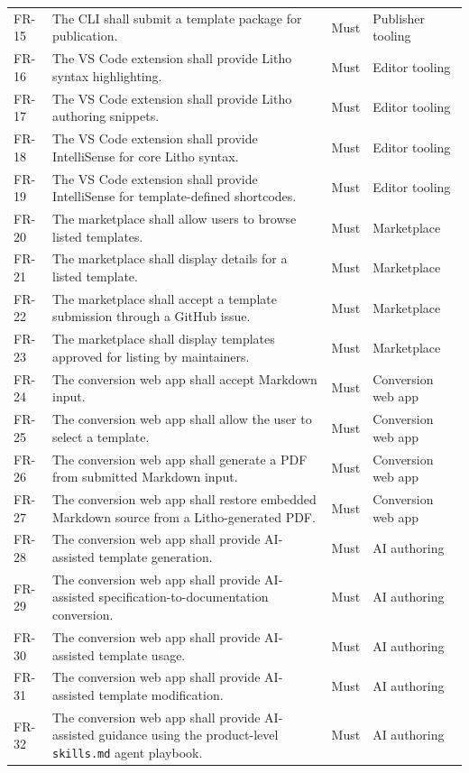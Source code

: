 \begin{xltabular}{\textwidth}{@{}p{0.12\textwidth}X p{0.15\textwidth}p{0.20\textwidth}@{}}
FR-15 & The CLI shall submit a template package for publication. & Must & Publisher tooling \\
FR-16 & The VS Code extension shall provide Litho syntax highlighting. & Must & Editor tooling \\
FR-17 & The VS Code extension shall provide Litho authoring snippets. & Must & Editor tooling \\
FR-18 & The VS Code extension shall provide IntelliSense for core Litho syntax. & Must & Editor tooling \\
FR-19 & The VS Code extension shall provide IntelliSense for template-defined shortcodes. & Must & Editor tooling \\
FR-20 & The marketplace shall allow users to browse listed templates. & Must & Marketplace \\
FR-21 & The marketplace shall display details for a listed template. & Must & Marketplace \\
FR-22 & The marketplace shall accept a template submission through a GitHub issue. & Must & Marketplace \\
FR-23 & The marketplace shall display templates approved for listing by maintainers. & Must & Marketplace \\
FR-24 & The conversion web app shall accept Markdown input. & Must & Conversion web app \\
FR-25 & The conversion web app shall allow the user to select a template. & Must & Conversion web app \\
FR-26 & The conversion web app shall generate a PDF from submitted Markdown input. & Must & Conversion web app \\
FR-27 & The conversion web app shall restore embedded Markdown source from a Litho-generated PDF. & Must & Conversion web app \\
FR-28 & The conversion web app shall provide AI-assisted template generation. & Must & AI authoring \\
FR-29 & The conversion web app shall provide AI-assisted specification-to-documentation conversion. & Must & AI authoring \\
FR-30 & The conversion web app shall provide AI-assisted template usage. & Must & AI authoring \\
FR-31 & The conversion web app shall provide AI-assisted template modification. & Must & AI authoring \\
FR-32 & The conversion web app shall provide AI-assisted guidance using the product-level \texttt{skills.md} agent playbook. & Must & AI authoring \\

\end{xltabular}
